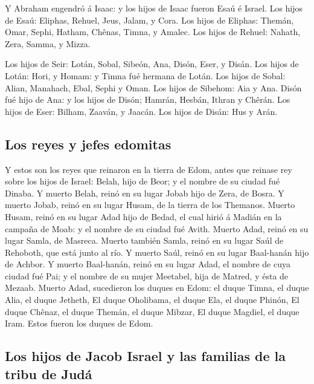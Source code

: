  Y Abraham engendró á Isaac: y los hijos de Isaac fueron
Esaú é Israel.  Los hijos de Esaú: Eliphas, Rehuel, Jeus,
Jalam, y Cora.  Los hijos de Eliphas: Themán, Omar, Sephi,
Hatham, Chênas, Timna, y Amalec.  Los hijos de Rehuel:
Nahath, Zera, Samma, y Mizza.

 Los hijos de Seir: Lotán, Sobal, Sibeón, Ana, Disón, Eser,
y Disán.  Los hijos de Lotán: Hori, y Homam: y Timna fué
hermana de Lotán.  Los hijos de Sobal: Alian, Manahach,
Ebal, Sephi y Oman. Los hijos de Sibehom: Aia y Ana.  Disón
fué hijo de Ana: y los hijos de Disón; Hamrán, Hesbán, Ithran y Chêrán.
 Los hijos de Eser: Bilham, Zaaván, y Jaacán. Los hijos de
Disán: Hus y Arán.

\hypertarget{los-reyes-y-jefes-edomitas}{%
\subsection{Los reyes y jefes
edomitas}\label{los-reyes-y-jefes-edomitas}}

 Y estos son los reyes que reinaron en la tierra de Edom,
antes que reinase rey sobre los hijos de Israel: Belah, hijo de Beor; y
el nombre de su ciudad fué Dinaba.  Y muerto Belah, reinó
en su lugar Jobab hijo de Zera, de Bosra.  Y muerto Jobab,
reinó en su lugar Husam, de la tierra de los Themanos. 
Muerto Husam, reinó en su lugar Adad hijo de Bedad, el cual hirió á
Madián en la campaña de Moab: y el nombre de su ciudad fué Avith.
 Muerto Adad, reinó en su lugar Samla, de Masreca.
 Muerto también Samla, reinó en su lugar Saúl de Rehoboth,
que está junto al río.  Y muerto Saúl, reinó en su lugar
Baal-hanán hijo de Achbor.  Y muerto Baal-hanán, reinó en
su lugar Adad, el nombre de cuya ciudad fué Pai; y el nombre de su mujer
Meetabel, hija de Matred, y ésta de Mezaab.  Muerto Adad,
sucedieron los duques en Edom: el duque Timna, el duque Alia, el duque
Jetheth,  El duque Oholibama, el duque Ela, el duque
Phinón,  El duque Chênaz, el duque Themán, el duque Mibzar,
 El duque Magdiel, el duque Iram. Estos fueron los duques
de Edom.

\hypertarget{los-hijos-de-jacob-israel-y-las-familias-de-la-tribu-de-juduxe1}{%
\subsection{Los hijos de Jacob Israel y las familias de la tribu de
Judá}\label{los-hijos-de-jacob-israel-y-las-familias-de-la-tribu-de-juduxe1}}

